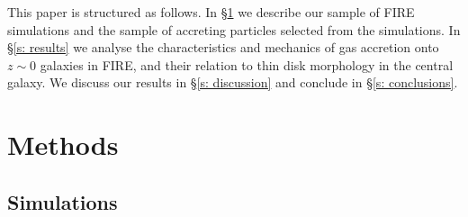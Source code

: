 \documentclass[fleqn,usenatbib]{mnras}
\begin{document}
This paper is structured as follows. 
In \S\ref{s: methods} we describe our sample of FIRE simulations and the sample of accreting particles selected from the simulations.
In \S\ref{s: results} we analyse the characteristics and mechanics of gas accretion onto $z\sim0$ galaxies in FIRE, and their relation to thin disk morphology in the central galaxy.
We discuss our results in \S\ref{s: discussion} and conclude in \S\ref{s: conclusions}.

\section{Methods}
\label{s: methods}

\subsection{Simulations}
\label{s: methods -- simulations}
\end{document}
